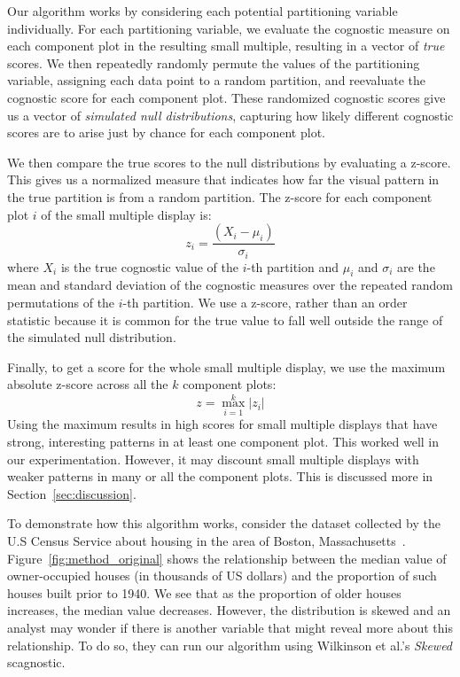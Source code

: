 Our algorithm works by considering each potential partitioning variable individually. For each partitioning variable, we evaluate the cognostic measure on each component plot in the resulting small multiple, resulting in a vector of \emph{true} scores. We then repeatedly randomly permute the values of the partitioning variable, assigning each data point to a random partition, and reevaluate the cognostic score for each component plot. These randomized cognostic scores give us a vector of \emph{simulated null distributions}, capturing how likely different cognostic scores are to arise just by chance for each component plot.

We then compare the true scores to the null distributions by evaluating a z-score. This gives us a normalized measure that indicates how far the visual pattern in the true partition is from a random partition. The z-score for each component plot $i$ of the small multiple display is:
$$z_i = \frac{(X_i-\mu_i)}{\sigma_i}$$ 
where $X_i$ is the true cognostic value of the $i$-th partition and $\mu_i$ and $\sigma_i$ are the mean and standard deviation of the cognostic measures over the repeated random permutations of the $i$-th partition. We use a z-score, rather than an order statistic because it is common for the true value to fall well outside the range of the simulated null distribution.

Finally, to get a score for the whole small multiple display, we use the maximum absolute z-score across all the $k$ component plots: 
$$z = \max_{i=1}^k |z_i|$$
Using the maximum results in high scores for small multiple displays that have strong, interesting patterns in at least one component plot. This worked well in our experimentation. However, it may discount small multiple displays with weaker patterns in many or all the component plots. This is discussed more in Section~\ref{sec:discussion}. 

To demonstrate how this algorithm works, consider the dataset
collected by the U.S Census Service about housing in the area of Boston, Massachusetts~\cite{Harrison1978}. Figure~\ref{fig:method_original} shows the relationship between the median value of owner-occupied houses (in thousands of US dollars) and the proportion of such houses built prior to 1940. We see that as the proportion of older houses increases, the median value decreases. However, the distribution is skewed and an analyst may wonder if there is another variable that might reveal more about this relationship.
To do so, they can run our algorithm using Wilkinson et al.'s \emph{Skewed} scagnostic.

